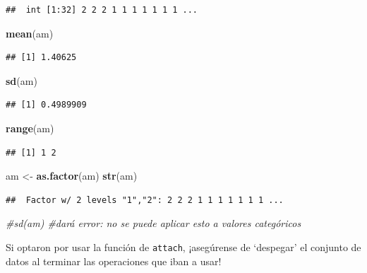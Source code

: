 \documentclass[
]{article}
\newenvironment{Shaded}{\begin{snugshade}}{\end{snugshade}}
\newcommand{\CommentTok}[1]{\textcolor[rgb]{0.56,0.35,0.01}{\textit{#1}}}
\newcommand{\FunctionTok}[1]{\textcolor[rgb]{0.13,0.29,0.53}{\textbf{#1}}}
\newcommand{\NormalTok}[1]{#1}
\newcommand{\OtherTok}[1]{\textcolor[rgb]{0.56,0.35,0.01}{#1}}
\begin{document}
\begin{verbatim}
##  int [1:32] 2 2 2 1 1 1 1 1 1 1 ...
\end{verbatim}

\begin{Shaded}
\begin{Highlighting}[]
\FunctionTok{mean}\NormalTok{(am)}
\end{Highlighting}
\end{Shaded}

\begin{verbatim}
## [1] 1.40625
\end{verbatim}

\begin{Shaded}
\begin{Highlighting}[]
\FunctionTok{sd}\NormalTok{(am)}
\end{Highlighting}
\end{Shaded}

\begin{verbatim}
## [1] 0.4989909
\end{verbatim}

\begin{Shaded}
\begin{Highlighting}[]
\FunctionTok{range}\NormalTok{(am)}
\end{Highlighting}
\end{Shaded}

\begin{verbatim}
## [1] 1 2
\end{verbatim}

\begin{Shaded}
\begin{Highlighting}[]
\NormalTok{am }\OtherTok{\textless{}{-}} \FunctionTok{as.factor}\NormalTok{(am)}
\FunctionTok{str}\NormalTok{(am)}
\end{Highlighting}
\end{Shaded}

\begin{verbatim}
##  Factor w/ 2 levels "1","2": 2 2 2 1 1 1 1 1 1 1 ...
\end{verbatim}

\begin{Shaded}
\begin{Highlighting}[]
\CommentTok{\#sd(am) \#dará error: no se puede aplicar esto a valores categóricos}
\end{Highlighting}
\end{Shaded}

Si optaron por usar la función de \texttt{attach}, ¡asegúrense de
`despegar' el conjunto de datos al terminar las operaciones que iban a
usar!
\end{document}
